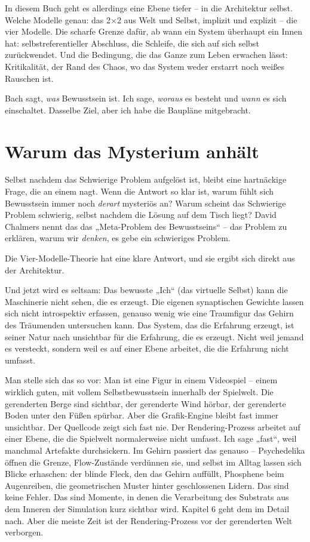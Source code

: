 \documentclass[11pt, twoside, openright]{book}
\begin{document}
In diesem Buch geht es allerdings eine Ebene tiefer -- in die Architektur selbst. Welche Modelle genau: das 2×2 aus Welt und Selbst, implizit und explizit -- die vier Modelle. Die scharfe Grenze dafür, ab wann ein System überhaupt ein Innen hat: selbstreferentieller Abschluss, die Schleife, die sich auf sich selbst zurückwendet. Und die Bedingung, die das Ganze zum Leben erwachen lässt: Kritikalität, der Rand des Chaos, wo das System weder erstarrt noch weißes Rauschen ist.

Bach sagt, \textit{was} Bewusstsein ist. Ich sage, \textit{woraus} es besteht und \textit{wann} es sich einschaltet. Dasselbe Ziel, aber ich habe die Baupläne mitgebracht.

\section*{Warum das Mysterium anhält}

Selbst nachdem das Schwierige Problem aufgelöst ist, bleibt eine hartnäckige Frage, die an einem nagt. Wenn die Antwort so klar ist, warum fühlt sich Bewusstsein immer noch \textit{derart} mysteriös an? Warum scheint das Schwierige Problem schwierig, selbst nachdem die Lösung auf dem Tisch liegt? David Chalmers nennt das das „Meta-Problem des Bewusstseins“ -- das Problem zu erklären, warum wir \textit{denken}, es gebe ein schwieriges Problem.

Die Vier-Modelle-Theorie hat eine klare Antwort, und sie ergibt sich direkt aus der Architektur.

Und jetzt wird es seltsam: Das bewusste „Ich“ (das virtuelle Selbst) kann die Maschinerie nicht sehen, die es erzeugt. Die eigenen synaptischen Gewichte lassen sich nicht introspektiv erfassen, genauso wenig wie eine Traumfigur das Gehirn des Träumenden untersuchen kann. Das System, das die Erfahrung erzeugt, ist seiner Natur nach unsichtbar für die Erfahrung, die es erzeugt. Nicht weil jemand es versteckt, sondern weil es auf einer Ebene arbeitet, die die Erfahrung nicht umfasst.

Man stelle sich das so vor: Man ist eine Figur in einem Videospiel -- einem wirklich guten, mit vollem Selbstbewusstsein innerhalb der Spielwelt. Die gerenderten Berge sind sichtbar, der gerenderte Wind hörbar, der gerenderte Boden unter den Füßen spürbar. Aber die Grafik-Engine bleibt fast immer unsichtbar. Der Quellcode zeigt sich fast nie. Der Rendering-Prozess arbeitet auf einer Ebene, die die Spielwelt normalerweise nicht umfasst. Ich sage „fast“, weil manchmal Artefakte durchsickern. Im Gehirn passiert das genauso -- Psychedelika öffnen die Grenze, Flow-Zustände verdünnen sie, und selbst im Alltag lassen sich Blicke erhaschen: der blinde Fleck, den das Gehirn auffüllt, Phosphene beim Augenreiben, die geometrischen Muster hinter geschlossenen Lidern. Das sind keine Fehler. Das sind Momente, in denen die Verarbeitung des Substrats aus dem Inneren der Simulation kurz sichtbar wird. Kapitel 6 geht dem im Detail nach. Aber die meiste Zeit ist der Rendering-Prozess vor der gerenderten Welt verborgen.
\end{document}
